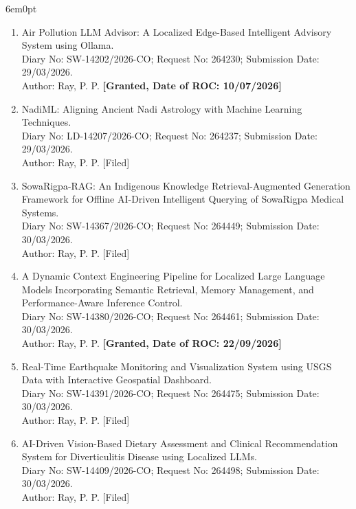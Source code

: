 \documentclass[11pt,a4paper]{moderncv}
\begin{document}
\begin{adjustwidth}{6em}{0pt}
	\begin{enumerate}
		
		\item Air Pollution LLM Advisor: A Localized Edge-Based Intelligent Advisory System using Ollama. \\
		Diary No: SW-14202/2026-CO; Request No: 264230; Submission Date: 29/03/2026.  \\
		Author: Ray, P. P. \textbf{[Granted, Date of ROC: 10/07/2026]}
		
		\item NadiML: Aligning Ancient Nadi Astrology with Machine Learning Techniques. \\
		Diary No: LD-14207/2026-CO; Request No: 264237; Submission Date: 29/03/2026. \\
		Author: Ray, P. P. [Filed]
		
		\item SowaRigpa-RAG: An Indigenous Knowledge Retrieval-Augmented Generation Framework for Offline AI-Driven Intelligent Querying of SowaRigpa Medical Systems. \\
		Diary No: SW-14367/2026-CO; Request No: 264449; Submission Date: 30/03/2026. \\
		Author: Ray, P. P. [Filed]
		
		\item A Dynamic Context Engineering Pipeline for Localized Large Language Models Incorporating Semantic Retrieval, Memory Management, and Performance-Aware Inference Control. \\
		Diary No: SW-14380/2026-CO; Request No: 264461; Submission Date: 30/03/2026. \\
		Author: Ray, P. P. \textbf{[Granted, Date of ROC: 22/09/2026]}
		
		\item Real-Time Earthquake Monitoring and Visualization System using USGS Data with Interactive Geospatial Dashboard. \\
		Diary No: SW-14391/2026-CO; Request No: 264475; Submission Date: 30/03/2026. \\
		Author: Ray, P. P. [Filed]
		
		\item AI-Driven Vision-Based Dietary Assessment and Clinical Recommendation System for Diverticulitis Disease using Localized LLMs. \\
		Diary No: SW-14409/2026-CO; Request No: 264498; Submission Date: 30/03/2026. \\
		Author: Ray, P. P. [Filed]
		

\end{enumerate}
\end{adjustwidth}
\end{document}
